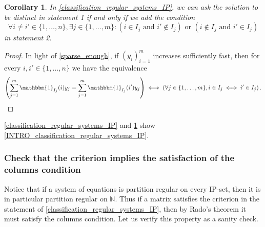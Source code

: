 \documentclass{article}
\theoremstyle{definition}
\theoremstyle{plain}
\newtheorem{corollary}[theorem]{Corollary}
\theoremstyle{remark}
\newcommand{\N}{\ensuremath{\mathbb{N}}}
\newcommand{\ind}{\ensuremath{ \mathbbm{1}}}
\begin{document}
\begin{corollary}\label{extra_distinct_solution}
    In \cref{classification_regular_systems_IP}, we can ask the solution to be distinct in statement 1 if and only if we add the condition
    $$\forall i \neq i' \in \{1,\ldots,n\}, \exists j \in \{1,\ldots,m\} : (i \in I_j\text{ and } i' \notin I_j) \text{ or } (i \notin I_j\text{ and } i' \in I_j)$$
    in statement 2.
\end{corollary}
\begin{proof}
    In light of \cref{sparse_enough}, if $(y_i)_{i=1}^m$ increases sufficiently fast, then for every $i,i'\in \{1,\ldots,n\}$ we have the equivalence
    $$\left ( \sum_{j=1}^m \ind_{I_j}(i) y_j = \sum_{j=1}^m \ind_{I_j}(i') y_j \right ) \iff \left (  \forall j\in \{1,\ldots,m\}, i \in I_j \iff i' \in I_j\right ).$$
\end{proof}
\cref{classification_regular_systems_IP} and \cref{extra_distinct_solution} show \cref{INTRO_classification_regular_systems_IP}.

\subsubsection{Check that the criterion implies the satisfaction of the columns condition}\label{check_criterion_columns_condition}
Notice that if a system of equations is partition regular on every IP-set, then it is in particular partition regular on $\N$. Thus if a matrix satisfies the criterion in the statement of \cref{classification_regular_systems_IP}, then by Rado's theorem it must satisfy the columns condition. Let us verify this property as a sanity check.
\end{document}
